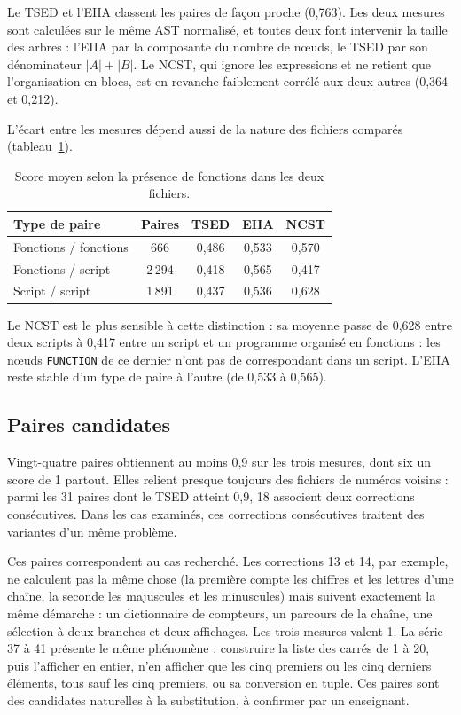 \documentclass[12pt,a4paper,oneside]{report}
\begin{document}
Le TSED et l'EIIA classent les paires de façon proche (0,763). Les deux
mesures sont calculées sur le même AST normalisé, et toutes deux font
intervenir la taille des arbres : l'EIIA par la composante du nombre de
nœuds, le TSED par son dénominateur $|A| + |B|$. Le NCST, qui ignore les
expressions et ne retient que l'organisation en blocs, est en revanche
faiblement corrélé aux deux autres (0,364 et 0,212).

L'écart entre les mesures dépend aussi de la nature des fichiers comparés
(tableau~\ref{tab:types_corpus}).

\begin{table}[htbp]
\centering
\small
\renewcommand{\arraystretch}{1.15}
\begin{tabular}{lcccc}
\toprule
\textbf{Type de paire} & \textbf{Paires} &
\textcolor{tsedcol}{\textbf{TSED}} & \textcolor{eiiacol}{\textbf{EIIA}} &
\textcolor{ncstcol}{\textbf{NCST}} \\
\midrule
Fonctions / fonctions & 666   & 0,486 & 0,533 & 0,570 \\
Fonctions / script    & 2\,294 & 0,418 & 0,565 & 0,417 \\
Script / script       & 1\,891 & 0,437 & 0,536 & 0,628 \\
\bottomrule
\end{tabular}
\caption{Score moyen selon la présence de fonctions dans les deux fichiers.}
\label{tab:types_corpus}
\end{table}

Le NCST est le plus sensible à cette distinction : sa moyenne passe de 0,628
entre deux scripts à 0,417 entre un script et un programme organisé en
fonctions : les nœuds \texttt{FUNCTION} de ce dernier n'ont pas de
correspondant dans un script. L'EIIA reste stable d'un type de paire à
l'autre (de 0,533 à 0,565).

\subsection{Paires candidates}

Vingt-quatre paires obtiennent au moins 0,9 sur les trois mesures, dont six
un score de 1 partout. Elles relient presque toujours des fichiers de numéros
voisins : parmi les 31 paires dont le TSED atteint 0,9, 18 associent deux
corrections consécutives. Dans les cas examinés, ces corrections
consécutives traitent des variantes d'un même problème.

Ces paires correspondent au cas recherché. Les corrections 13 et 14, par
exemple, ne calculent pas la même chose (la première compte les chiffres et
les lettres d'une chaîne, la seconde les majuscules et les minuscules) mais
suivent exactement la même démarche : un dictionnaire de compteurs, un parcours de
la chaîne, une sélection à deux branches et deux affichages. Les trois mesures
valent 1. La série 37 à 41 présente le même phénomène : construire la liste
des carrés de 1 à 20, puis l'afficher en entier, n'en afficher que les cinq
premiers ou les cinq derniers éléments, tous sauf les cinq premiers, ou sa
conversion en tuple. Ces paires sont des candidates naturelles
à la substitution, à confirmer par un enseignant.
\end{document}
